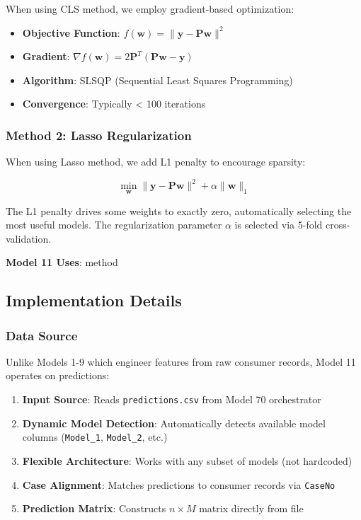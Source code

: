 When using CLS method, we employ gradient-based optimization:

\begin{itemize}
    \item \textbf{Objective Function}: $f(\mathbf{w}) = \|\mathbf{y} - \mathbf{P}\mathbf{w}\|^2$
    \item \textbf{Gradient}: $\nabla f(\mathbf{w}) = 2\mathbf{P}^T(\mathbf{P}\mathbf{w} - \mathbf{y})$
    \item \textbf{Algorithm}: SLSQP (Sequential Least Squares Programming)
    \item \textbf{Convergence}: Typically < 100 iterations
\end{itemize}

\subsubsection{Method 2: Lasso Regularization}

When using Lasso method, we add L1 penalty to encourage sparsity:

\begin{equation}
\min_{\mathbf{w}} \|\mathbf{y} - \mathbf{P}\mathbf{w}\|^2 + \alpha \|\mathbf{w}\|_1
\end{equation}

The L1 penalty drives some weights to exactly zero, automatically selecting the most useful models. The regularization parameter $\alpha$ is selected via 5-fold cross-validation.

\textbf{Model 11 Uses}: \ModelElevenMethod{} method

\subsection{Implementation Details}

\subsubsection{Data Source}

Unlike Models 1-9 which engineer features from raw consumer records, Model 11 operates on predictions:

\begin{enumerate}
    \item \textbf{Input Source}: Reads \texttt{predictions.csv} from Model 70 orchestrator
    \item \textbf{Dynamic Model Detection}: Automatically detects available model columns (\texttt{Model\_1}, \texttt{Model\_2}, etc.)
    \item \textbf{Flexible Architecture}: Works with any subset of models (not hardcoded)
    \item \textbf{Case Alignment}: Matches predictions to consumer records via \texttt{CaseNo}
    \item \textbf{Prediction Matrix}: Constructs $n \times M$ matrix directly from file
\end{enumerate}

